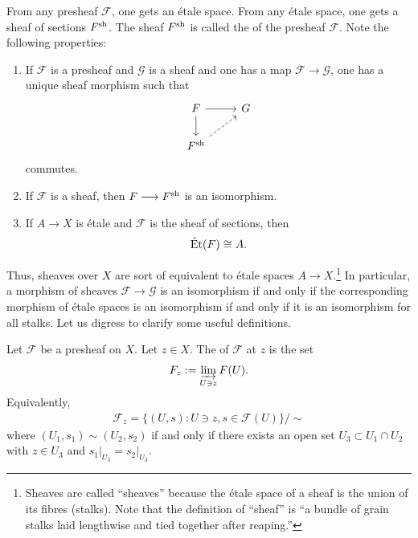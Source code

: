 \documentclass [11 pt, oneside] {article}
\begin{document}
From any presheaf $\mathscr{F}$, one gets an \'etale space. From any \'etale space, one gets a sheaf of sections $\mathscr{F}\sh$. The sheaf $\mathscr{F}\sh$ is called the  of the presheaf $\mathscr{F}$. Note the following properties:
\begin{enumerate}
	\item If $\mathscr{F}$ is a presheaf and $\mathscr{G}$ is a sheaf and one has a map $\mathscr{F}\longrightarrow \mathscr{G}$, one has a unique sheaf morphism such that
		\[
		\begin{tikzcd}
			\mathscr{F} \ar[r] \ar[d] & \mathscr{G}\\
			\mathscr{F}\sh \ar[ur, dashed]
		\end{tikzcd}
		\]
		commutes.
	\item If $\mathscr{F}$ is a sheaf, then $\mathscr{F}\longrightarrow \mathscr{F}\sh$ is an isomorphism. 
	\item If $A\longrightarrow X$ is \'etale and $\mathscr{F}$ is the sheaf of sections, then
		\begin{align*}
			\Et ( \mathscr{F} ) \isomto A.
		\end{align*}
\end{enumerate}

Thus, sheaves over $X$ are sort of equivalent to \'etale spaces $A\longrightarrow X$.\footnote{Sheaves are called ``sheaves'' because the \'etale space of a sheaf is the union of its fibres (stalks). Note that the definition of ``sheaf'' is ``a bundle of grain stalks laid lengthwise and tied together after reaping.''} In particular, a morphism of sheaves $\mathscr{F}\longrightarrow \mathscr{G}$ is an isomorphism if and only if the corresponding morphism of \'etale spaces is an isomorphism if and only if it is an isomorphism for all stalks. Let us digress to clarify some useful definitions.

 \begin{definition}[ ]\label{}\text{}
Let $\mathscr{F}$ be a presheaf on $X$. Let $z\in X$. The  of $\mathscr{F}$ at $z$ is the set
\begin{align*}
	\mathscr{F}_z := \varinjlim_{U\ni z} \mathscr{F}(U).
\end{align*}
Equivalently,
\begin{align*}
	\mathscr{F}_z= \{(U,s) : U\ni z, s\in  \mathscr{F}(U)\} / \sim
\end{align*}
where $(U_1,s_1)\sim(U_2,s_2) $ if and only if there exists an open set $U_3 \subset U_1\cap U_2$ with $z\in U_3$ and $s_1\big |_{U_3} = s_2\big |_{U_3}$.
\end{definition}
\end{document}
